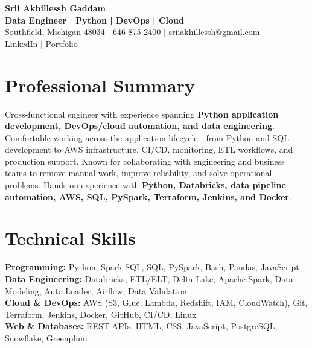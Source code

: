 \documentclass[letterpaper,10pt]{article}
\begin{document}
\fontsize{9.35pt}{10.45pt}\selectfont

\begin{center}
    {\LARGE \textbf{Srii Akhillessh Gaddam}} \\[-1pt]
    \textbf{Data Engineer | Python | DevOps | Cloud} \\[2pt]
    Southfield, Michigan 48034 $|$
    \href{tel:6468752400}{646-875-2400} $|$
    \href{mailto:sriiakhillessh@gmail.com}{sriiakhillessh@gmail.com} \\[1pt]
    \href{https://www.linkedin.com/in/srii-akhiilessh-gaddam-b48668191/}{LinkedIn} $|$
    \href{https://sriiakhillesshg.github.io/portfolio/}{Portfolio}
\end{center}
\vspace{-8pt}

\section{Professional Summary}
\small{Cross-functional engineer with experience spanning \textbf{Python application development, DevOps/cloud automation, and data engineering}. Comfortable working across the application lifecycle - from Python and SQL development to AWS infrastructure, CI/CD, monitoring, ETL workflows, and production support. Known for collaborating with engineering and business teams to remove manual work, improve reliability, and solve operational problems. Hands-on experience with \textbf{Python, Databricks, data pipeline automation, AWS, SQL, PySpark, Terraform, Jenkins, and Docker}.}

\section{Technical Skills}
\small{
\textbf{Programming:} Python, Spark SQL, SQL, PySpark, Bash, Pandas, JavaScript \\
\textbf{Data Engineering:} Databricks, ETL/ELT, Delta Lake, Apache Spark, Data Modeling, Auto Loader, Airflow, Data Validation \\
\textbf{Cloud \& DevOps:} AWS (S3, Glue, Lambda, Redshift, IAM, CloudWatch), Git, Terraform, Jenkins, Docker, GitHub, CI/CD, Linux \\
\textbf{Web \& Databases:} REST APIs, HTML, CSS, JavaScript, PostgreSQL, Snowflake, Greenplum
}

\end{document}
